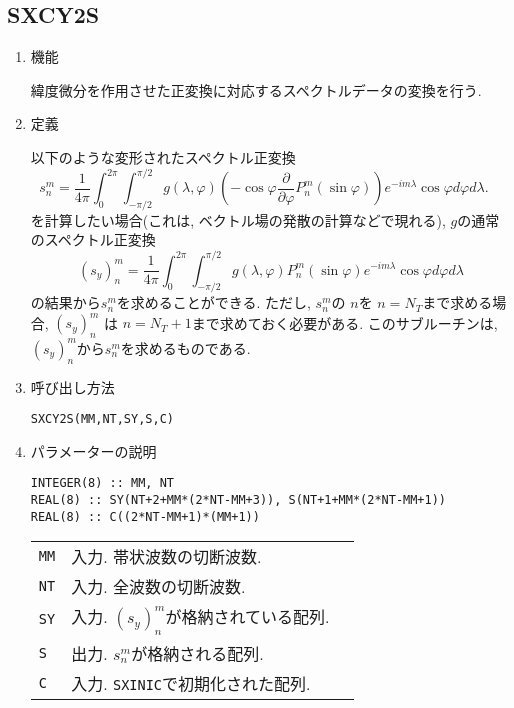 \documentclass[a4j]{jsarticle}
\begin{document}

\subsection{SXCY2S}

\begin{enumerate}

\item 機能 

緯度微分を作用させた正変換に対応するスペクトルデータの変換を行う.

\item 定義

以下のような変形されたスペクトル正変換
\begin{equation}
s^m_n=\frac1{4\pi}\int^{2\pi}_0\int^{\pi/2}_{-\pi/2}
g(\lambda,\varphi)
\left(-\cos\varphi\frac{\partial}{\partial\varphi}P^m_n(\sin\varphi)\right)
e^{-im\lambda}\cos\varphi d\varphi
d\lambda .
\quad 
\end{equation}
を計算したい場合(これは, ベクトル場の発散の計算などで現れる), 
$g$の通常のスペクトル正変換
\begin{equation}
(s_y)^m_n=\frac1{4\pi}\int^{2\pi}_0\int^{\pi/2}_{-\pi/2}
g(\lambda,\varphi)
P^m_n(\sin\varphi)
e^{-im\lambda}\cos\varphi d\varphi
d\lambda
\end{equation}
の結果から$s^m_n$を求めることができる.
ただし, $s^m_n$の $n$を $n=N_T$まで求める場合, $(s_y)^m_n$
は $n=N_T+1$まで求めておく必要がある.
このサブルーチンは, $(s_y)^m_n$から$s^m_n$を求めるものである.

\item 呼び出し方法 

\texttt{SXCY2S(MM,NT,SY,S,C)}
  
\item パラメーターの説明

\begin{verbatim}
INTEGER(8) :: MM, NT
REAL(8) :: SY(NT+2+MM*(2*NT-MM+3)), S(NT+1+MM*(2*NT-MM+1))
REAL(8) :: C((2*NT-MM+1)*(MM+1))
\end{verbatim}

\begin{tabular}{lll}
\texttt{MM} & 入力. 帯状波数の切断波数.\\  
\texttt{NT} & 入力. 全波数の切断波数.\\
\texttt{SY} & 入力. $(s_y)^m_n$が格納されている配列.\\
\texttt{S} &  出力. $s^m_n$が格納される配列.\\
\texttt{C} & 入力. \texttt{SXINIC}で初期化された配列.
\end{tabular}


\end{enumerate}
\end{document}
